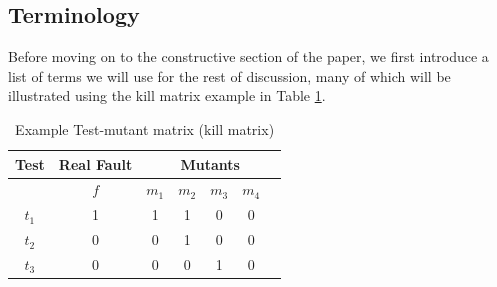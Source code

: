 \documentclass[10pt,letterpaper]{article}
\begin{document}
\subsection{Terminology} 

Before moving on to the constructive section of the paper, we first introduce a list of terms we will use for the rest of discussion, many of which will be illustrated using the kill matrix example in Table \ref{tab:coupling}. 


\begin{table}[ht!]
\captionsetup{justification=centering}
\begin{center}
\begin{tabular}{c c c c c c c}
\hline
\multicolumn{1}{c}{Test} & \multicolumn{1}{c}{Real Fault} & \multicolumn{5}{c}{Mutants} \\
\hline
      & $f$ & $m_1$ & $m_2$ & $m_3$ & $m_4$  \\
\hline
$t_1$ &  1  &   1   &   1   &   0   &   0   &    \\
$t_2$ &  0  &   0   &   1   &   0   &   0   &    \\
$t_3$ &  0  &   0   &   0   &   1   &   0  &    \\
\hline
\end{tabular}
\caption{Example Test-mutant matrix (kill matrix)} \label{tab:coupling}
\end{center}
\end{table}
\end{document}
